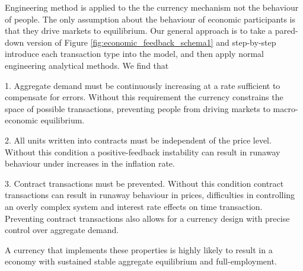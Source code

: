 Engineering method is applied to the the currency mechanism not the behaviour of people. The only
assumption about the behaviour of economic participants is that they drive markets to equilibrium.
Our general approach is to take a pared-down version of Figure \ref{fig:economic_feedback_schema1}
and step-by-step introduce each transaction type into the model, and then apply normal engineering
analytical methods. We find that

1. Aggregate demand must be continuously increasing at a rate sufficient to compensate for errors.
Without this requirement the currency constrains the space of possible transactions, preventing
people from driving markets to macro-economic equilibrium.

2. All units written into contracts must be independent of the price level. Without this condition a
positive-feedback instability can result in runaway behaviour under increases in the inflation rate.

3. Contract transactions must be prevented. Without this condition contract transactions can result
in runaway behaviour in prices, difficulties in controlling an overly complex system and interest
rate effects on time transaction. Preventing contract transactions also allows for a currency design
with precise control over aggregate demand.

A currency that implements these properties is highly likely to result in a economy with sustained
stable aggregate equilibrium and full-employment. 

